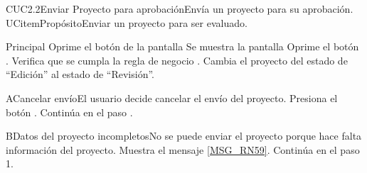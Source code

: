 
\begin{UseCase}{CUC2.2}{Enviar Proyecto para aprobación}{Envía un proyecto para su aprobación.}
		UCitem{Propósito}{Enviar un proyecto para ser evaluado.}
\end{UseCase}
	
	
\begin{UCtrayectoria}{Principal}
		\UCpaso[\UCactor] Oprime el botón  de la pantalla %
		\UCpaso Se muestra la pantalla 
		\UCpaso[\UCactor] Oprime el botón . 
		\UCpaso Verifica que se cumpla la regla de negocio . 
		\UCpaso Cambia el proyecto del estado de ``Edición'' al estado de ``Revisión''.
\end{UCtrayectoria}

\begin{UCtrayectoriaA}{A}{Cancelar envío}{El usuario decide cancelar el envío del proyecto.}
			\UCpaso[\UCactor] Presiona el botón .
			\UCpaso Continúa en el paso .
\end{UCtrayectoriaA}

\begin{UCtrayectoriaA}{B}{Datos del proyecto incompletos}{No se puede enviar el proyecto porque hace falta información del proyecto.}
			\UCpaso Muestra el mensaje \ref{MSG_RN59}.
			\UCpaso Continúa en el paso 1.
\end{UCtrayectoriaA}

